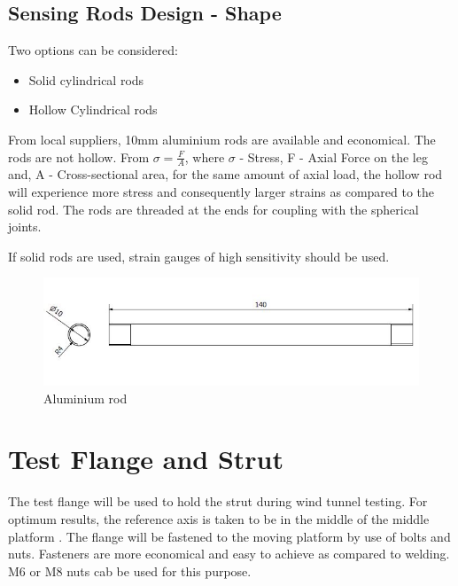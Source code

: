 \subsection{Sensing Rods Design - Shape}
Two options can be considered:
\begin{itemize}
\item Solid cylindrical rods
\item Hollow Cylindrical rods
\end{itemize}
From local suppliers, 10mm aluminium rods are available and economical. The rods are not hollow. From $\sigma = \frac{F}{A}$, where $\sigma$ - Stress, F - Axial Force on the leg and, A - Cross-sectional area, for the same amount of axial load, the hollow rod will experience more stress and consequently larger strains as compared to the solid rod. The rods are threaded at the ends for coupling with the spherical joints.

If solid rods are used, strain gauges of high sensitivity should be used.
\begin{center}
	\begin{figure}[H]
	\centering
	\includegraphics[width=0.8\linewidth]{Figures/Rod}
	\caption[Aluminium rod]{Aluminium rod}
	\end{figure}
\end{center}

\section{Test Flange and Strut}
The test flange will be used to hold the strut during wind tunnel testing. For optimum results, the reference axis is taken to be in the middle of the middle platform \cite {fernandes_design_nodate}. The flange will be fastened to the moving platform by use of bolts and nuts. Fasteners are more economical and easy to achieve as compared to welding. M6 or M8 nuts cab be used for this purpose.

